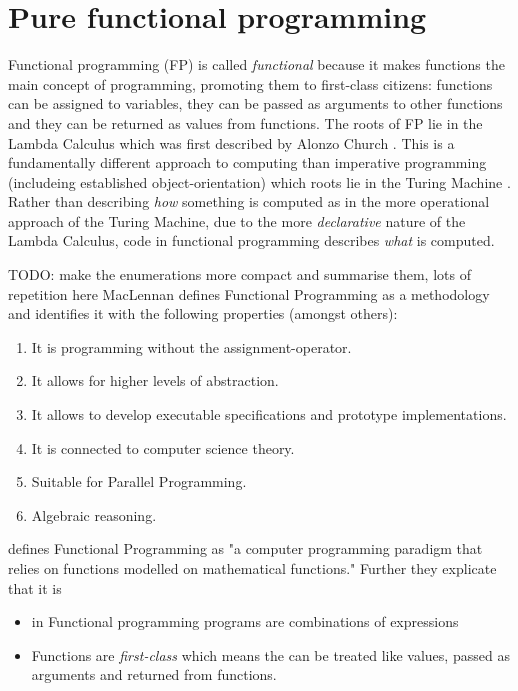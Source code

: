 \section{Pure functional programming}
Functional programming (FP) is called \textit{functional} because it makes functions the main concept of programming, promoting them to first-class citizens: functions can be assigned to variables, they can be passed as arguments to other functions and they can be returned as values from functions. The roots of FP lie in the Lambda Calculus which was first described by Alonzo Church \cite{church_unsolvable_1936}. This is a fundamentally different approach to computing than imperative programming (includeing established object-orientation)  which roots lie in the Turing Machine \cite{turing_computable_1937}. Rather than describing \textit{how} something is computed as in the more operational approach of the Turing Machine, due to the more \textit{declarative} nature of the Lambda Calculus, code in functional programming describes \textit{what} is computed.

TODO: make the enumerations more compact and summarise them, lots of repetition here 
MacLennan \cite{maclennan_functional_1990} defines Functional Programming as a methodology and identifies it with the following properties (amongst others):

\begin{enumerate}
	\item It is programming without the assignment-operator.
	\item It allows for higher levels of abstraction.
	\item It allows to develop executable specifications and prototype implementations.
	\item It is connected to computer science theory.
	\item Suitable for Parallel Programming.
	\item Algebraic reasoning.
\end{enumerate}

\cite{allen_haskell_2016} defines Functional Programming as "a computer programming paradigm that relies on functions modelled on mathematical functions." Further they explicate that it is 
\begin{itemize}
	\item in Functional programming programs are combinations of expressions
	\item Functions are \textit{first-class} which means the can be treated like values, passed as arguments and returned from functions.
\end{itemize}


